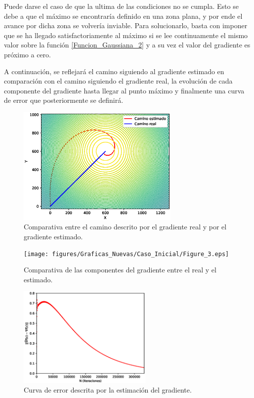 Puede darse el caso de que la ultima de las condiciones no se cumpla. Esto se debe a que el máximo se encontraría definido en una zona plana, y por ende el avance por dicha zona se volvería inviable. Para solucionarlo, basta con imponer que se ha llegado satisfactoriamente al máximo si se lee continuamente el mismo valor sobre la función \ref{Funcion_Gaussiana_2} y a su vez el valor del gradiente es próximo a cero. 

A continuación, se reflejará el camino siguiendo al gradiente estimado en comparación con el camino siguiendo el gradiente real, la evolución de cada componente del gradiente hasta llegar al punto máximo y finalmente una curva de error que posteriormente se definirá.

\begin{figure}[H]
\centering
\includegraphics[width=0.70\textwidth]{figures/Caso_Inicial/Caminos.eps}
\caption{Comparativa entre el camino descrito por el gradiente real y por el gradiente estimado.} \label{Dif_Caminos}
\end{figure}

\begin{figure}[H]
\centering
\texttt{[image: figures/Graficas\_Nuevas/Caso\_Inicial/Figure\_3.eps]}
\caption{Comparativa de las componentes del gradiente entre el real y el estimado.} \label{grad}
\end{figure}

\begin{figure}[H]
\centering
\includegraphics[width=0.58\textwidth]{figures/Graficas_Nuevas/Caso_Inicial/Figure_5.eps}
\caption{Curva de error descrita por la estimación del gradiente.} \label{Curva_error}
\end{figure}

